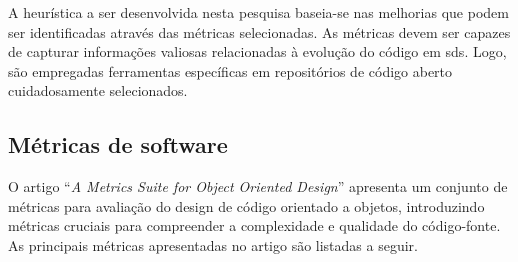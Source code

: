 A heurística a ser desenvolvida nesta pesquisa baseia-se nas melhorias que podem ser identificadas através das métricas selecionadas. As métricas devem ser capazes de capturar informações valiosas relacionadas à evolução do código em \gls{sds}. Logo, são empregadas ferramentas específicas em repositórios de código aberto cuidadosamente selecionados. 

\subsection{Métricas de software} \label{sec:metricasDeSoftware}
O artigo ``\textit{A Metrics Suite for Object Oriented Design}'' \cite{MetricsSuite} apresenta um conjunto de métricas para avaliação do design de código orientado a objetos, introduzindo métricas cruciais para compreender a complexidade e qualidade do código-fonte. As principais métricas apresentadas no artigo são listadas a seguir.

